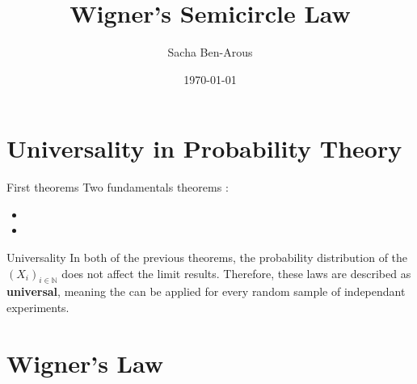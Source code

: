 \documentclass[10pt, a4paper]{beamer}
\title{Wigner's Semicircle Law}
\date{\today}
\author{Sacha Ben-Arous}
\institute{ENS Paris-Saclay}
\begin{document}
  \maketitle
  
\begin{frame}
\tableofcontents
\end{frame}  

\section{Universality in Probability Theory}

\begin{frame}{First theorems}
    Two fundamentals theorems :
\begin{itemize}
\item <1> 
\item <2> 
\end{itemize}
\end{frame}

\begin{frame}{Universality}
In both of the previous theorems, the probability distribution of the $(X_i)_{i \in \mathbb{N}}$ does not affect the limit results. Therefore, these laws are described as \textbf{universal}, meaning the can be applied for every random sample of independant experiments.
\end{frame}

\section{Wigner's Law}
\end{document}
